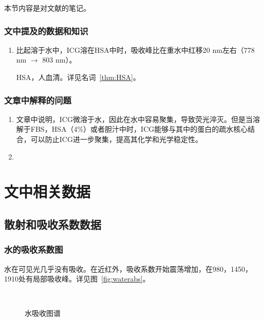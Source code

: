 \documentclass[cn,11pt,chinese]{elegantbook}
\begin{document}
本节内容是对文献\cite{Hemubin2020}的笔记。

\subsection{文中提及的数据和知识}
\begin{enumerate}
  \item 比起溶于水中，ICG溶在HSA中时，吸收峰比在重水中红移20 nm左右（778 nm $\to$ 803 nm）。
\begin{note}
  HSA，人血清。详见名词~\vref{thm:HSA}。
\end{note}
\end{enumerate}

\subsection{文章中解释的问题}
\begin{enumerate}[itemsep=1.5ex]
   \item {}
  文章中说明，ICG微溶于水，因此在水中容易聚集，导致荧光淬灭。但是当溶解于FBS，HSA（4\%）或者胆汁中时，ICG能够与其中的蛋白的疏水核心结合，可以防止ICG进一步聚集，提高其化学和光学稳定性。
   \item {}

 \end{enumerate} 


\appendix
\chapter{文中相关数据}

\section{散射和吸收系数数据}

\subsection{水的吸收系数图}
水在可见光几乎没有吸收。在近红外，吸收系数开始震荡增加，在980，1450，1910处有局部吸收峰。详见图~\vref{fig:waterabs}。
\begin{figure}[ht]
	\centering
	 \\
  \caption{水吸收图谱}
	\label{fig:waterabs}
\end{figure}
\end{document}
